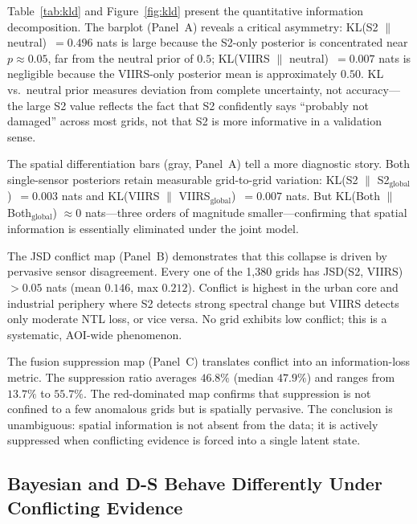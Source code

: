 \documentclass[wcp]{jmlr}
\begin{document}
Table~\ref{tab:kld} and Figure~\ref{fig:kld} present the quantitative
information decomposition. The barplot (Panel~A) reveals a critical
asymmetry: KL(S2 $\|$ neutral)~$=0.496$ nats is large because the S2-only
posterior is concentrated near $p\approx0.05$, far from the neutral prior
of $0.5$; KL(VIIRS $\|$ neutral)~$=0.007$ nats is negligible because the
VIIRS-only posterior mean is approximately $0.50$. KL vs.\ neutral prior
measures deviation from complete uncertainty, not accuracy---the large S2
value reflects the fact that S2 confidently says ``probably not damaged''
across most grids, not that S2 is more informative in a validation sense.

The spatial differentiation bars (gray, Panel~A) tell a more diagnostic
story. Both single-sensor posteriors retain measurable grid-to-grid
variation: KL(S2 $\|$ S2$_{\text{global}}$)~$=0.003$ nats and KL(VIIRS
$\|$ VIIRS$_{\text{global}}$)~$=0.007$ nats. But KL(Both $\|$
Both$_{\text{global}}$) $\approx 0$ nats---three orders of magnitude
smaller---confirming that spatial information is essentially eliminated
under the joint model.

The JSD conflict map (Panel~B) demonstrates that this collapse is driven by
pervasive sensor disagreement. Every one of the 1{,}380 grids has JSD(S2,
VIIRS) $>0.05$ nats (mean $0.146$, max $0.212$). Conflict is highest in
the urban core and industrial periphery where S2 detects strong spectral
change but VIIRS detects only moderate NTL loss, or vice versa. No grid
exhibits low conflict; this is a systematic, AOI-wide phenomenon.

The fusion suppression map (Panel~C) translates conflict into an
information-loss metric. The suppression ratio averages $46.8\%$ (median
$47.9\%$) and ranges from $13.7\%$ to $55.7\%$. The red-dominated map
confirms that suppression is not confined to a few anomalous grids but is
spatially pervasive. The conclusion is unambiguous: spatial information is
not absent from the data; it is actively suppressed when conflicting
evidence is forced into a single latent state.

\subsection{Bayesian and D-S Behave Differently Under Conflicting
Evidence}\label{sec:res-ds}
\end{document}
